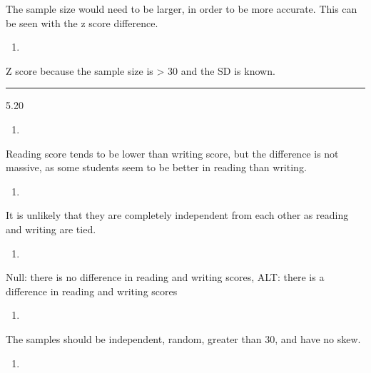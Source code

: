 \documentclass[]{article}
\begin{document}
The sample size would need to be larger, in order to be more accurate.
This can be seen with the z score difference.

\begin{enumerate}
\def\labelenumi{\alph{enumi}.}
\setcounter{enumi}{2}
\item
\end{enumerate}

Z score because the sample size is \textgreater{} 30 and the SD is
known.

\begin{center}\rule{0.5\linewidth}{\linethickness}\end{center}

5.20

\begin{enumerate}
\def\labelenumi{\alph{enumi}.}
\item
\end{enumerate}

Reading score tends to be lower than writing score, but the difference
is not massive, as some students seem to be better in reading than
writing.

\begin{enumerate}
\def\labelenumi{\alph{enumi}.}
\setcounter{enumi}{1}
\item
\end{enumerate}

It is unlikely that they are completely independent from each other as
reading and writing are tied.

\begin{enumerate}
\def\labelenumi{\alph{enumi}.}
\setcounter{enumi}{2}
\item
\end{enumerate}

Null: there is no difference in reading and writing scores, ALT: there
is a difference in reading and writing scores

\begin{enumerate}
\def\labelenumi{\alph{enumi}.}
\setcounter{enumi}{3}
\item
\end{enumerate}

The samples should be independent, random, greater than 30, and have no
skew.

\begin{enumerate}
\def\labelenumi{\alph{enumi}.}
\setcounter{enumi}{4}
\item
\end{enumerate}
\end{document}
